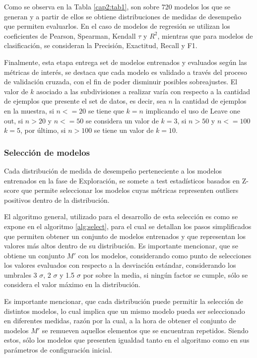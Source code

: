 Como se observa en la Tabla \ref{cap2:tab1}, son sobre 720 modelos los que se generan y a partir de ellos se obtiene distribuciones de medidas de desempeño que permiten evaluarlos. En el caso de modelos de regresión se utilizan los coeficientes de Pearson, Spearman, Kendall $\tau$ y $R^{2}$, mientras que para modelos de clasificación, se consideran la Precisión, Exactitud, Recall y F1.

Finalmente, esta etapa entrega set de modelos entrenados y evaluados según las métricas de interés, se destaca que cada modelo es validado a través del proceso de validación cruzada, con el fin de poder disminuir posibles sobreajustes. El valor de $k$ asociado a las subdivisiones a realizar varía con respecto a la cantidad de ejemplos que presente el set de datos, es decir, sea $n$ la cantidad de ejemplos en la muestra, si $n<=20$ se tiene que $k=n$ implicando el uso de Leave one out, si $n>20$ y $n<=50$ se considera un valor de $k=3$, si $n>50$ y $n<=100$ $k=5$, por último, si $n>100$ se tiene un valor de $k=10$.

\subsubsection{Selección de modelos}

Cada distribución de medida de desempeño perteneciente a los modelos entrenados en la fase de Exploración, se somete a test estadísticos basados en Z-score \cite{pedregosa2011scikit} que permite seleccionar los modelos cuyas métricas representen outliers positivos dentro de la distribución.

El algoritmo general, utilizado para el desarrollo de esta selección es como se expone en el algoritmo \ref{alg:select}, para el cual se detallan los pasos simplificados que permiten obtener un conjunto de modelos entrenados y que representan los valores más altos dentro de su distribución. Es importante mencionar, que se obtiene un conjunto $M'$ con los modelos, considerando como punto de selecciones los valores evaluados con respecto a la desviación estándar, considerando los umbrales 3 $\sigma$, 2 $\sigma$ y 1.5 $\sigma$ por sobre la media, si ningún factor se cumple, sólo se considera el valor máximo en la distribución.

Es importante mencionar, que cada distribución puede permitir la selección de distintos modelos, lo cual implica que un mismo modelo pueda ser seleccionado en diferentes medidas, razón por la cual, a la hora de obtener el conjunto de modelos $M'$ se remueven aquellos elementos que se encuentran repetidos. Siendo estos, sólo los modelos que presenten igualdad tanto en el algoritmo como en sus parámetros de configuración inicial.

